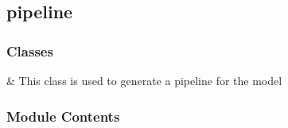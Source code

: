 \documentclass[letterpaper,10pt,english]{sphinxmanual}
\begin{document}
\sphinxstepscope


\subsection{pipeline}
\label{\detokenize{autoapi/pipeline/index:module-pipeline}}\label{\detokenize{autoapi/pipeline/index:pipeline}}\label{\detokenize{autoapi/pipeline/index::doc}}

\subsubsection{Classes}
\label{\detokenize{autoapi/pipeline/index:classes}}

\begin{savenotes}\sphinxattablestart
\sphinxthistablewithglobalstyle
\sphinxthistablewithnovlinesstyle
\centering
\begin{tabulary}{\linewidth}[t]{}
\sphinxtoprule
\sphinxtableatstartofbodyhook
\sphinxAtStartPar
{}
&
\sphinxAtStartPar
This class is used to generate a pipeline for the model
\\
\sphinxbottomrule
\end{tabulary}
\sphinxtableafterendhook\par
\sphinxattableend\end{savenotes}


\subsubsection{Module Contents}
\label{\detokenize{autoapi/pipeline/index:module-contents}}
\end{document}
